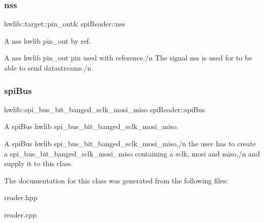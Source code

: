 \subsubsection{\texorpdfstring{nss}{nss}}
{\footnotesize\ttfamily hwlib\+::target\+::pin\+\_\+out\& spi\+Reader\+::nss\hspace{0.3cm}{\ttfamily [protected]}}



A nss hwlib pin\+\_\+out by ref. 

A nss hwlib pin\+\_\+out pin used with reference./n The signal nss is used for to be able to send datastreams./n \mbox{\label{classspiReader_adb87e7c8ca2a11337b67fe8efce50262}} 
\subsubsection{\texorpdfstring{spi\+Bus}{spiBus}}
{\footnotesize\ttfamily hwlib\+::spi\+\_\+bus\+\_\+bit\+\_\+banged\+\_\+sclk\+\_\+mosi\+\_\+miso spi\+Reader\+::spi\+Bus\hspace{0.3cm}{\ttfamily [protected]}}



A spi\+Bus hwlib spi\+\_\+bus\+\_\+bit\+\_\+banged\+\_\+sclk\+\_\+mosi\+\_\+miso. 

A spi\+Bus hwlib spi\+\_\+bus\+\_\+bit\+\_\+banged\+\_\+sclk\+\_\+mosi\+\_\+miso,/n the user has to create a spi\+\_\+bus\+\_\+bit\+\_\+banged\+\_\+sclk\+\_\+mosi\+\_\+miso containing a sclk, mosi and miso,/n and supply it to this class. 

The documentation for this class was generated from the following files\+:\begin{DoxyCompactItemize}
\item 
reader.\+hpp\item 
reader.\+cpp\end{DoxyCompactItemize}

